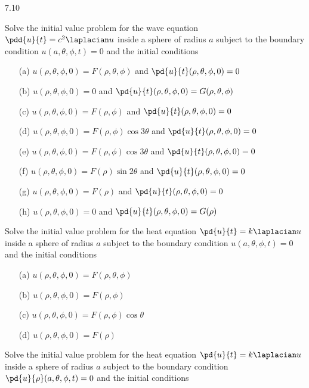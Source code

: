 \begin{exercises}{7.10}

\item Solve the initial value problem for the wave equation $\pdd{u}{t} = c^2\laplacian u$ inside a sphere of radius $a$ subject to the boundary condition $u(a,\theta,\phi,t) = 0$ and the initial conditions

\begin{enumerate}
\item[(a)] $u(\rho,\theta,\phi,0) = F(\rho,\theta,\phi)$ and $\pd{u}{t}(\rho,\theta,\phi,0) = 0$
\item[(b)] $u(\rho,\theta,\phi,0) = 0$ and $\pd{u}{t}(\rho,\theta,\phi,0) = G(\rho,\theta,\phi)$
\item[(c)] $u(\rho,\theta,\phi,0) = F(\rho,\phi)$ and $\pd{u}{t}(\rho,\theta,\phi,0) = 0$
\item[(d)] $u(\rho,\theta,\phi,0) = F(\rho,\phi)\cos 3\theta$ and $\pd{u}{t}(\rho,\theta,\phi,0) = 0$
\item[(e)] $u(\rho,\theta,\phi,0) = F(\rho,\phi)\cos 3\theta$ and $\pd{u}{t}(\rho,\theta,\phi,0) = 0$
\item[(f)] $u(\rho,\theta,\phi,0) = F(\rho)\sin 2\theta$ and $\pd{u}{t}(\rho,\theta,\phi,0) = 0$
\item[(g)] $u(\rho,\theta,\phi,0) = F(\rho)$ and $\pd{u}{t}(\rho,\theta,\phi,0) = 0$
\item[(h)] $u(\rho,\theta,\phi,0) = 0$ and $\pd{u}{t}(\rho,\theta,\phi,0) = G(\rho)$
\end{enumerate}

\item Solve the initial value problem for the heat equation $\pd{u}{t} = k\laplacian u$ inside a sphere of radius $a$ subject to the boundary condition $u(a,\theta,\phi,t) = 0$ and the initial conditions

\begin{enumerate}
\item[(a)] $u(\rho,\theta,\phi,0) = F(\rho,\theta,\phi)$
\item[(b)] $u(\rho,\theta,\phi,0) = F(\rho,\phi)$
\item[(c)] $u(\rho,\theta,\phi,0) = F(\rho,\phi)\cos\theta$
\item[(d)] $u(\rho,\theta,\phi,0) = F(\rho)$
\end{enumerate}

\item Solve the initial value problem for the heat equation $\pd{u}{t} = k\laplacian u$ inside a sphere of radius $a$ subject to the boundary condition $\pd{u}{\rho}(a,\theta,\phi,t) = 0$ and the initial conditions


\end{exercises}
